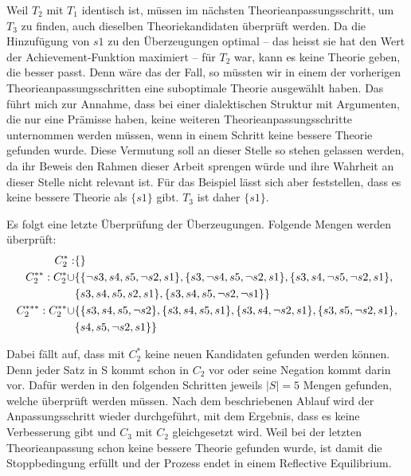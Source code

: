 \documentclass{article}
\begin{document}
 Weil $T_2$ mit $T_1$ identisch ist, müssen im nächsten Theorieanpassungsschritt, um $T_3$ zu finden, auch dieselben Theoriekandidaten überprüft werden. Da die Hinzufügung von $s1$ zu den Überzeugungen optimal -- das heisst sie hat den Wert der Achievement-Funktion maximiert -- für $T_2$ war, kann es keine Theorie geben, die besser passt. Denn wäre das der Fall, so müssten wir in einem der vorherigen Theorieanpassungsschritten eine suboptimale Theorie ausgewählt haben. Das führt mich zur Annahme, dass bei einer dialektischen Struktur mit Argumenten, die nur eine Prämisse haben, keine weiteren Theorieanpassungsschritte unternommen werden müssen, wenn in einem Schritt keine bessere Theorie gefunden wurde. Diese Vermutung soll an dieser Stelle so stehen gelassen werden, da ihr Beweis den Rahmen dieser Arbeit sprengen würde und ihre Wahrheit an dieser Stelle nicht relevant ist. Für das Beispiel lässt sich aber feststellen, dass es keine bessere Theorie als $\{s1\}$ gibt. $T_3$ ist daher $\{s1\}$.
 
 Es folgt eine letzte Überprüfung der Überzeugungen. Folgende Mengen werden überprüft:
 \begin{align}
    C_2^{*}: &\{\}\\
    C_2^{**}: C_2^{*} \cup &\{\{\neg s3, s4, s5, \neg s2, s1\}, \{s3, \neg s4, s5, \neg s2, s1\}, \{s3, s4, \neg s5, \neg s2, s1\},\\ \notag
    &\{s3, s4, s5, s2, s1\}, \{s3, s4, s5, \neg s2, \neg s1\}\}\\
    C_2^{***}: C_2^{**} \cup &\{\{s3, s4, s5, \neg s2\}, \{s3, s4, s5, s1\}, \{s3, s4, \neg s2, s1\}, \{s3, s5, \neg s2, s1\},\\ \notag
    &\{s4, s5, \neg s2, s1\}\}
 \end{align}
 
 Dabei fällt auf, dass mit $C_2^{*}$ keine neuen Kandidaten gefunden werden können. Denn jeder Satz in S kommt schon in $C_2$ vor oder seine Negation kommt darin vor. Dafür werden in den folgenden Schritten jeweils $\lvert S \rvert = 5$ Mengen gefunden, welche überprüft werden müssen.
 Nach dem beschriebenen Ablauf wird der Anpassungsschritt wieder durchgeführt, mit dem Ergebnis, dass es keine Verbesserung gibt und $C_3$ mit $C_2$ gleichgesetzt wird. Weil bei der letzten Theorieanpassung schon keine bessere Theorie gefunden wurde, ist damit die Stoppbedingung erfüllt und der Prozess endet in einem Reflective Equilibrium.
 
\end{document}
